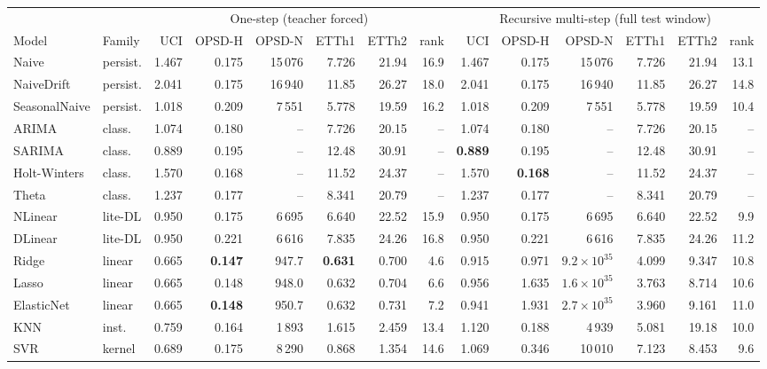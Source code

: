 \begin{tabular}{llrrrrrrrrrrrr}
\toprule
& & \multicolumn{6}{c}{One-step (teacher forced)} & \multicolumn{6}{c}{Recursive multi-step (full test window)} \\
\cmidrule(lr){3-8}\cmidrule(lr){9-14}
Model & Family & UCI & OPSD-H & OPSD-N & ETTh1 & ETTh2 & rank & UCI & OPSD-H & OPSD-N & ETTh1 & ETTh2 & rank \\
\midrule
Naive & persist. & 1.467 & 0.175 & 15\,076 & 7.726 & 21.94 & 16.9 & 1.467 & 0.175 & 15\,076 & 7.726 & 21.94 & 13.1 \\
NaiveDrift & persist. & 2.041 & 0.175 & 16\,940 & 11.85 & 26.27 & 18.0 & 2.041 & 0.175 & 16\,940 & 11.85 & 26.27 & 14.8 \\
SeasonalNaive & persist. & 1.018 & 0.209 & 7\,551 & 5.778 & 19.59 & 16.2 & 1.018 & 0.209 & 7\,551 & 5.778 & 19.59 & 10.4 \\
ARIMA & class. & 1.074 & 0.180 & -- & 7.726 & 20.15 & -- & 1.074 & 0.180 & -- & 7.726 & 20.15 & -- \\
SARIMA & class. & 0.889 & 0.195 & -- & 12.48 & 30.91 & -- & \textbf{0.889} & 0.195 & -- & 12.48 & 30.91 & -- \\
Holt-Winters & class. & 1.570 & 0.168 & -- & 11.52 & 24.37 & -- & 1.570 & \textbf{0.168} & -- & 11.52 & 24.37 & -- \\
Theta & class. & 1.237 & 0.177 & -- & 8.341 & 20.79 & -- & 1.237 & 0.177 & -- & 8.341 & 20.79 & -- \\
NLinear & lite-DL & 0.950 & 0.175 & 6\,695 & 6.640 & 22.52 & 15.9 & 0.950 & 0.175 & 6\,695 & 6.640 & 22.52 & 9.9 \\
DLinear & lite-DL & 0.950 & 0.221 & 6\,616 & 7.835 & 24.26 & 16.8 & 0.950 & 0.221 & 6\,616 & 7.835 & 24.26 & 11.2 \\
Ridge & linear & 0.665 & \textbf{0.147} & 947.7 & \textbf{0.631} & 0.700 & 4.6 & 0.915 & 0.971 & $9.2{\times}10^{35}$ & 4.099 & 9.347 & 10.8 \\
Lasso & linear & 0.665 & 0.148 & 948.0 & 0.632 & 0.704 & 6.6 & 0.956 & 1.635 & $1.6{\times}10^{35}$ & 3.763 & 8.714 & 10.6 \\
ElasticNet & linear & 0.665 & \textbf{0.148} & 950.7 & 0.632 & 0.731 & 7.2 & 0.941 & 1.931 & $2.7{\times}10^{35}$ & 3.960 & 9.161 & 11.0 \\
KNN & inst. & 0.759 & 0.164 & 1\,893 & 1.615 & 2.459 & 13.4 & 1.120 & 0.188 & 4\,939 & 5.081 & 19.18 & 10.0 \\
SVR & kernel & 0.689 & 0.175 & 8\,290 & 0.868 & 1.354 & 14.6 & 1.069 & 0.346 & 10\,010 & 7.123 & 8.453 & 9.6 \\

\end{tabular}
